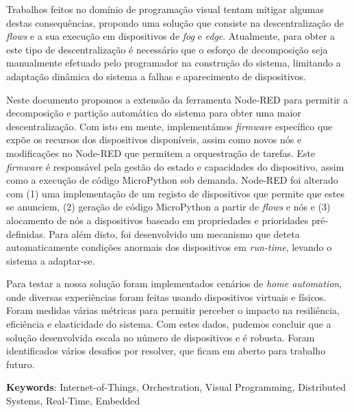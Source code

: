 Trabalhos feitos no domínio de programação visual tentam mitigar algumas destas consequências, propondo uma solução que consiste na descentralização de \emph{flows} e a sua execução em dispositivos de \emph{fog} e \emph{edge}. Atualmente, para obter a este tipo de descentralização é necessário que o esforço de decomposição seja manualmente efetuado pelo programador na construção do sistema, limitando a adaptação dinâmica do sistema a falhas e aparecimento de dispositivos.

Neste documento propomos a extensão da ferramenta Node-RED para permitir a decomposição e partição automática do sistema para obter uma maior descentralização. Com isto em mente, implementámos \textit{firmware} específico que expõe os recursos dos dispositivos disponíveis, assim como novos nós e modificações no Node-RED que permitem a orquestração de tarefas. Este \textit{firmware} é responsável pela gestão do estado e capacidades do dispositivo, assim como a execução de código MicroPython sob demanda. Node-RED foi alterado com (1) uma implementação de um registo de dispositivos que permite que estes se anunciem, (2) geração de código MicroPython a partir de \textit{flows} e nós e (3) alocamento de nós a dispositivos baseado em propriedades e prioridades pré-definidas. Para além disto, foi desenvolvido um mecanismo que deteta automaticamente condições anormais dos dispositivos em \emph{run-time}, levando o sistema a adaptar-se.

Para testar a nossa solução foram implementados cenários de \textit{home automation}, onde diversas experiências foram feitas usando dispositivos virtuais e físicos. Foram medidas várias métricas para permitir perceber o impacto na resiliência, eficiência e elasticidade do sistema. Com estes dados, pudemos concluir que a solução desenvolvida escala no número de dispositivos e é robusta. Foram identificados vários desafios por resolver, que ficam em aberto para trabalho futuro.

\vspace*{10mm}\noindent

\textbf{Keywords}: Internet-of-Things, Orchestration, Visual Programming, Distributed Systems, Real-Time, Embedded
